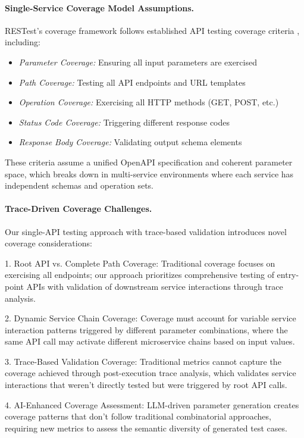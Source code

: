 \documentclass[conference]{IEEEtran}
\begin{document}
\paragraph{Single-Service Coverage Model Assumptions.}
RESTest's coverage framework follows established API testing coverage criteria \cite{martin2019restest}, including:
\begin{itemize}[leftmargin=*]
    \item \textit{Parameter Coverage:} Ensuring all input parameters are exercised
    \item \textit{Path Coverage:} Testing all API endpoints and URL templates  
    \item \textit{Operation Coverage:} Exercising all HTTP methods (GET, POST, etc.)
    \item \textit{Status Code Coverage:} Triggering different response codes
    \item \textit{Response Body Coverage:} Validating output schema elements
\end{itemize}

These criteria assume a unified OpenAPI specification and coherent parameter space, which breaks down in multi-service environments where each service has independent schemas and operation sets.

\paragraph{Trace-Driven Coverage Challenges.}
Our single-API testing approach with trace-based validation introduces novel coverage considerations:

1. Root API vs. Complete Path Coverage: Traditional coverage focuses on exercising all endpoints; our approach prioritizes comprehensive testing of entry-point APIs with validation of downstream service interactions through trace analysis.

2. Dynamic Service Chain Coverage: Coverage must account for variable service interaction patterns triggered by different parameter combinations, where the same API call may activate different microservice chains based on input values.

3. Trace-Based Validation Coverage: Traditional metrics cannot capture the coverage achieved through post-execution trace analysis, which validates service interactions that weren't directly tested but were triggered by root API calls.

4. AI-Enhanced Coverage Assessment: LLM-driven parameter generation creates coverage patterns that don't follow traditional combinatorial approaches, requiring new metrics to assess the semantic diversity of generated test cases.
\end{document}
